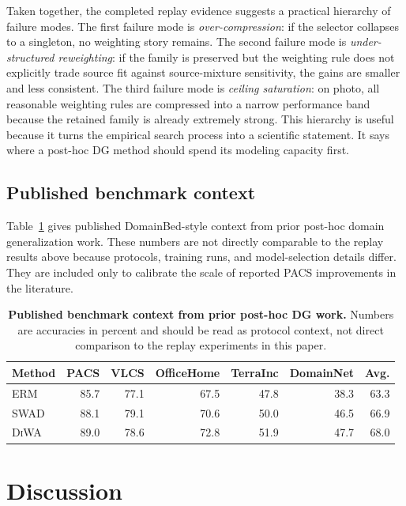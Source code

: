 \documentclass{article}
\theoremstyle{definition}
\newcommand{\erm}{\textup{\textsc{ERM}}}
\newcommand{\swad}{\textup{\textsc{SWAD}}}
\newcommand{\diwa}{\textup{\textsc{DiWA}}}
\begin{document}
Taken together, the completed replay evidence suggests a practical hierarchy of failure modes. The first failure mode is \emph{over-compression}: if the selector collapses to a singleton, no weighting story remains. The second failure mode is \emph{under-structured reweighting}: if the family is preserved but the weighting rule does not explicitly trade source fit against source-mixture sensitivity, the gains are smaller and less consistent. The third failure mode is \emph{ceiling saturation}: on photo, all reasonable weighting rules are compressed into a narrow performance band because the retained family is already extremely strong. This hierarchy is useful because it turns the empirical search process into a scientific statement. It says where a post-hoc DG method should spend its modeling capacity first.

\subsection{Published benchmark context}

Table~\ref{tab:published_context} gives published DomainBed-style context from prior post-hoc domain generalization work. These numbers are not directly comparable to the replay results above because protocols, training runs, and model-selection details differ. They are included only to calibrate the scale of reported PACS improvements in the literature.

\begin{table}[t]
\centering
\caption{\textbf{Published benchmark context from prior post-hoc DG work.} Numbers are accuracies in percent and should be read as protocol context, not direct comparison to the replay experiments in this paper.}
\label{tab:published_context}
\begin{tabular}{lrrrrrr}
\toprule
Method & PACS & VLCS & OfficeHome & TerraInc & DomainNet & Avg. \\
\midrule
\erm{} \citep{cha2021swad}  & 85.7 & 77.1 & 67.5 & 47.8 & 38.3 & 63.3 \\
\swad{} \citep{cha2021swad} & 88.1 & 79.1 & 70.6 & 50.0 & 46.5 & 66.9 \\
\diwa{} \citep{rame2022diwa} & 89.0 & 78.6 & 72.8 & 51.9 & 47.7 & 68.0 \\
\bottomrule
\end{tabular}
\end{table}

\section{Discussion}
\end{document}
